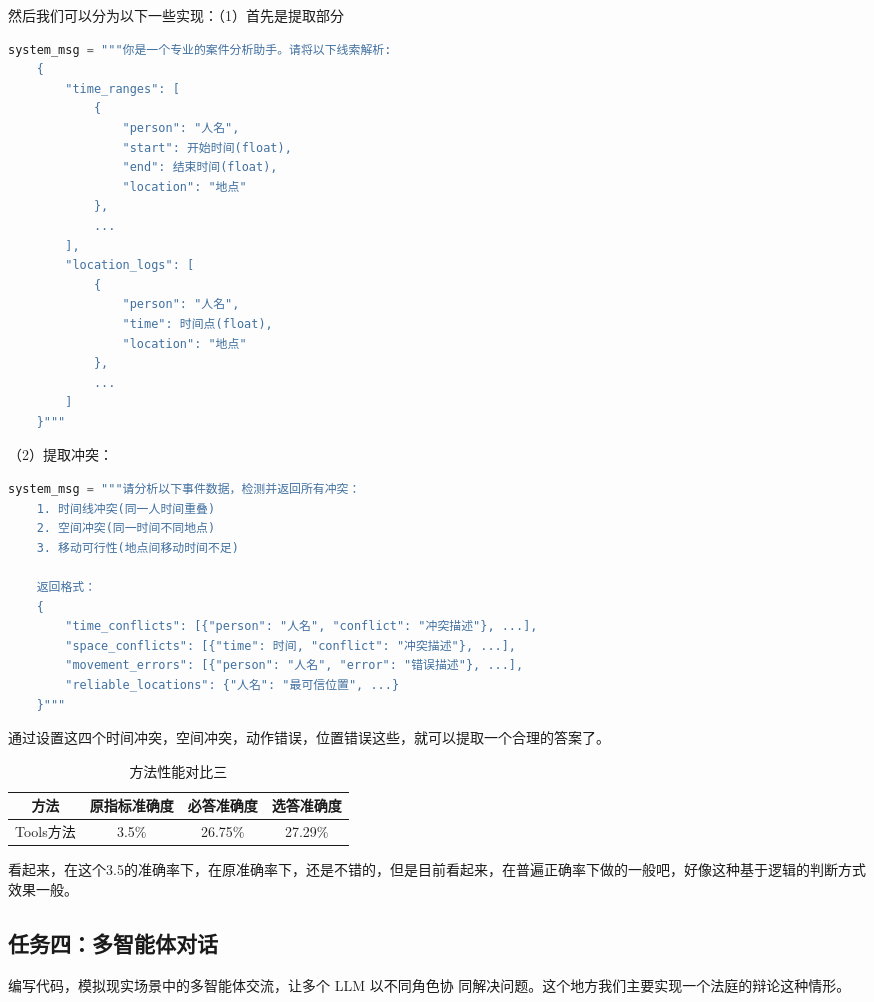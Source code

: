 \documentclass[answers]{exam}  %
\begin{document}
然后我们可以分为以下一些实现：（1）首先是提取部分
\begin{lstlisting}[language=python]
    system_msg = """你是一个专业的案件分析助手。请将以下线索解析:
    {
        "time_ranges": [
            {
                "person": "人名",
                "start": 开始时间(float),
                "end": 结束时间(float),
                "location": "地点"
            },
            ...
        ],
        "location_logs": [
            {
                "person": "人名",
                "time": 时间点(float),
                "location": "地点"
            },
            ...
        ]
    }"""
\end{lstlisting}

（2）提取冲突：

\begin{lstlisting}[language=python]
    system_msg = """请分析以下事件数据，检测并返回所有冲突：
    1. 时间线冲突(同一人时间重叠)
    2. 空间冲突(同一时间不同地点)
    3. 移动可行性(地点间移动时间不足)
    
    返回格式：
    {
        "time_conflicts": [{"person": "人名", "conflict": "冲突描述"}, ...],
        "space_conflicts": [{"time": 时间, "conflict": "冲突描述"}, ...],
        "movement_errors": [{"person": "人名", "error": "错误描述"}, ...],
        "reliable_locations": {"人名": "最可信位置", ...}
    }"""
\end{lstlisting}

通过设置这四个时间冲突，空间冲突，动作错误，位置错误这些，就可以提取一个合理的答案了。

\begin{table}[h]
    \centering
    \begin{tabular}{cccc}
    \toprule
    \textbf{方法} & \textbf{原指标准确度} & \textbf{必答准确度} &\textbf{选答准确度}\\
    \midrule
    Tools方法 & 3.5\% & 26.75\% & 27.29\% \\
    \bottomrule
    \end{tabular}
    \caption{方法性能对比三}
\end{table}

看起来，在这个3.5的准确率下，在原准确率下，还是不错的，但是目前看起来，在普遍正确率下做的一般吧，好像这种基于逻辑的判断方式效果一般。

\subsection{任务四：多智能体对话}

编写代码，模拟现实场景中的多智能体交流，让多个 LLM 以不同角色协
同解决问题。这个地方我们主要实现一个法庭的辩论这种情形。
\end{document}
